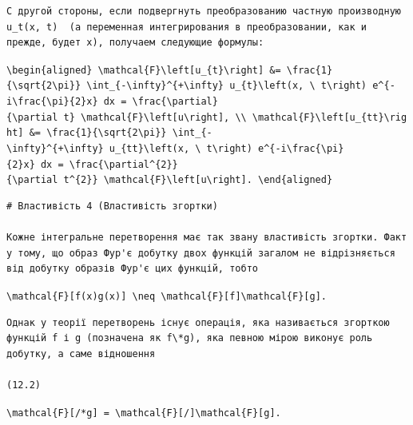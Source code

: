 \documentclass[
  ukrainian,
]{article}
\begin{document}
\begin{verbatim}
С другой стороны, если подвергнуть преобразованию частную производную  u_t(x, t)  (а переменная интегрирования в преобразовании, как и прежде, будет x), получаем следующие формулы:
\end{verbatim}

\texttt{\textbackslash{}begin\{aligned\}\ \textbackslash{}mathcal\{F\}\textbackslash{}left{[}u\_\{t\}\textbackslash{}right{]}\ \&=\ \textbackslash{}frac\{1\}\{\textbackslash{}sqrt\{2\textbackslash{}pi\}\}\ \textbackslash{}int\_\{-\textbackslash{}infty\}\^{}\{+\textbackslash{}infty\}\ u\_\{t\}\textbackslash{}left(x,\ \textbackslash{}\ t\textbackslash{}right)\ e\^{}\{-i\textbackslash{}frac\{\textbackslash{}pi\}\{2\}x\}\ dx\ =\ \textbackslash{}frac\{\textbackslash{}partial\}\{\textbackslash{}partial\ t\}\ \textbackslash{}mathcal\{F\}\textbackslash{}left{[}u\textbackslash{}right{]},\ \textbackslash{}\textbackslash{}\ \textbackslash{}mathcal\{F\}\textbackslash{}left{[}u\_\{tt\}\textbackslash{}right{]}\ \&=\ \textbackslash{}frac\{1\}\{\textbackslash{}sqrt\{2\textbackslash{}pi\}\}\ \textbackslash{}int\_\{-\textbackslash{}infty\}\^{}\{+\textbackslash{}infty\}\ u\_\{tt\}\textbackslash{}left(x,\ \textbackslash{}\ t\textbackslash{}right)\ e\^{}\{-i\textbackslash{}frac\{\textbackslash{}pi\}\{2\}x\}\ dx\ =\ \textbackslash{}frac\{\textbackslash{}partial\^{}\{2\}\}\{\textbackslash{}partial\ t\^{}\{2\}\}\ \textbackslash{}mathcal\{F\}\textbackslash{}left{[}u\textbackslash{}right{]}.\ \textbackslash{}end\{aligned\}}

\begin{verbatim}
# Властивість 4 (Властивість згортки)

Кожне інтегральне перетворення має так звану властивість згортки. Факт у тому, що образ Фур'є добутку двох функцій загалом не відрізняється від добутку образів Фур'є цих функцій, тобто
\end{verbatim}

\texttt{\textbackslash{}mathcal\{F\}{[}f(x)g(x){]}\ \textbackslash{}neq\ \textbackslash{}mathcal\{F\}{[}f{]}\textbackslash{}mathcal\{F\}{[}g{]}.}

\begin{verbatim}
Однак у теорії перетворень існує операція, яка називається згорткою функцій f і g (позначена як f\*g), яка певною мірою виконує роль добутку, а саме відношення

(12.2)
\end{verbatim}

\texttt{\textbackslash{}mathcal\{F\}{[}/*g{]}\ =\ \textbackslash{}mathcal\{F\}{[}/{]}\textbackslash{}mathcal\{F\}{[}g{]}.}
\end{document}

